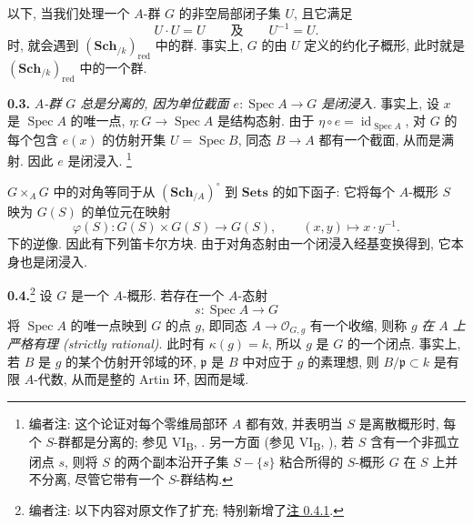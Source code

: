 以下, 当我们处理一个 \(A\)-群 \(G\) 的非空局部闭子集 \(U\),
且它满足
\[
  U\cdot U=U
  \qquad\text{及}\qquad
  U^{-1}=U.
\]
时, 就会遇到 \((\mathbf{Sch}_{/k})_{\mathrm{red}}\) 中的群.
事实上, \(G\) 的由 \(U\) 定义的约化子概形,
此时就是 \((\mathbf{Sch}_{/k})_{\mathrm{red}}\) 中的一个群.

\medskip
\noindent\textbf{0.3.}
\label{sga3:VIA:0.3}
\textit{\(A\)-群 \(G\) 总是分离的,
因为单位截面 \(e:\operatorname{Spec}A\to G\) 是闭浸入.}
事实上, 设 \(x\) 是 \(\operatorname{Spec}A\) 的唯一点,
\(\eta:G\to\operatorname{Spec}A\) 是结构态射.
由于 \(\eta\circ e=\operatorname{id}_{\operatorname{Spec}A}\),
对 \(G\) 的每个包含 \(e(x)\) 的仿射开集 \(U=\operatorname{Spec}B\),
同态 \(B\to A\) 都有一个截面, 从而是满射.
因此 \(e\) 是闭浸入.
\footnote{编者注: 这个论证对每个零维局部环 \(A\) 都有效,
并表明当 \(S\) 是离散概形时, 每个 \(S\)-群都是分离的;
参见 VI\textsubscript{B}, .
另一方面 (参见 VI\textsubscript{B}, ),
若 \(S\) 含有一个非孤立闭点 \(s\),
则将 \(S\) 的两个副本沿开子集 \(S-\{s\}\) 粘合所得的
\(S\)-概形 \(G\) 在 \(S\) 上并不分离,
尽管它带有一个 \(S\)-群结构.}

\(G\times_A G\) 中的对角等同于从
\((\mathbf{Sch}_{/A})^\circ\) 到 \(\mathbf{Sets}\) 的如下函子:
它将每个 \(A\)-概形 \(S\) 映为 \(G(S)\) 的单位元在映射
\[
  \varphi(S):G(S)\times G(S)\longrightarrow G(S),
  \qquad (x,y)\longmapsto x\cdot y^{-1}.
\]
下的逆像. 因此有下列笛卡尔方块.
由于对角态射由一个闭浸入经基变换得到, 它本身也是闭浸入.

\begin{center}
  \label{sga3:VIA:0.3-cartesian-square}
\end{center}


\medskip
\noindent\textbf{0.4.}\footnote{编者注: 以下内容对原文作了扩充;
特别新增了\hyperref[sga3:VIA:0.4.1]{注 0.4.1}.}
\label{sga3:VIA:0.4}
设 \(G\) 是一个 \(A\)-概形.
若存在一个 \(A\)-态射
\[
  s:\operatorname{Spec}A\longrightarrow G
\]
将 \(\operatorname{Spec}A\) 的唯一点映到 \(G\) 的点 \(g\),
即同态 \(A\to\mathcal O_{G,g}\) 有一个收缩,
则称 \(g\) \emph{在 \(A\) 上严格有理 (strictly rational)}.
此时有 \(\kappa(g)=k\), 所以 \(g\) 是 \(G\) 的一个闭点.
事实上, 若 \(B\) 是 \(g\) 的某个仿射开邻域的环,
\(\mathfrak p\) 是 \(B\) 中对应于 \(g\) 的素理想,
则 \(B/\mathfrak p\subset k\) 是有限 \(A\)-代数,
从而是整的 Artin 环, 因而是域.

